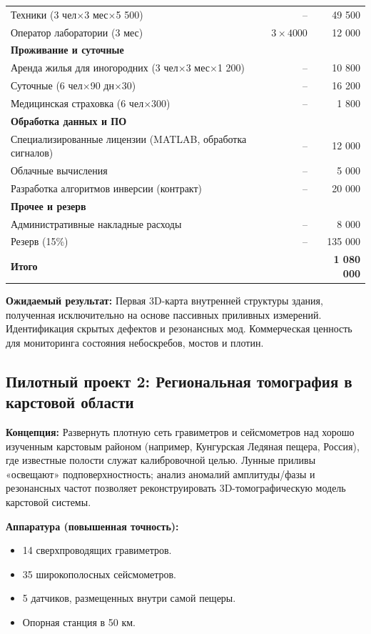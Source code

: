 \documentclass[12pt,a4paper]{article}
\theoremstyle{remark}
\begin{document}
\begin{table}[htbp]
\begin{tabular}{lrr}
			Техники (3 чел$\times$3 мес$\times$5 500) & – & 49 500 \\
			Оператор лаборатории (3 мес) & $3\times4 000$ & 12 000 \\
			\multicolumn{3}{l}{\textbf{Проживание и суточные}} \\
			Аренда жилья для иногородних (3 чел$\times$3 мес$\times$1 200) & – & 10 800 \\
			Суточные (6 чел$\times$90 дн$\times$30) & – & 16 200 \\
			Медицинская страховка (6 чел$\times$300) & – & 1 800 \\
			\multicolumn{3}{l}{\textbf{Обработка данных и ПО}} \\
			Специализированные лицензии (MATLAB, обработка сигналов) & – & 12 000 \\
			Облачные вычисления & – & 5 000 \\
			Разработка алгоритмов инверсии (контракт) & – & 20 000 \\
			\multicolumn{3}{l}{\textbf{Прочее и резерв}} \\
			Административные накладные расходы & – & 8 000 \\
			Резерв (15\%) & – & 135 000 \\
			\midrule
			\textbf{Итого} & & \textbf{1 080 000} \\
			\bottomrule
		\end{tabular}
	\end{table}
	
	\textbf{Ожидаемый результат:} Первая 3D-карта внутренней структуры здания, полученная исключительно на основе пассивных приливных измерений. Идентификация скрытых дефектов и резонансных мод. Коммерческая ценность для мониторинга состояния небоскребов, мостов и плотин.
	
	\subsection{Пилотный проект 2: Региональная томография в карстовой области}
	
	\textbf{Концепция:} Развернуть плотную сеть гравиметров и сейсмометров над хорошо изученным карстовым районом (например, Кунгурская Ледяная пещера, Россия), где известные полости служат калибровочной целью. Лунные приливы «освещают» подповерхностность; анализ аномалий амплитуды/фазы и резонансных частот позволяет реконструировать 3D-томографическую модель карстовой системы.
	
	\textbf{Аппаратура (повышенная точность):}
	\begin{itemize}
		\item 14 сверхпроводящих гравиметров.
		\item 35 широкополосных сейсмометров.
		\item 5 датчиков, размещенных внутри самой пещеры.
		\item Опорная станция в 50 км.
	\end{itemize}
	
\end{document}
